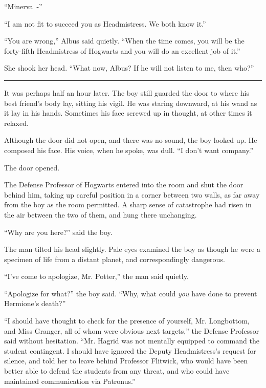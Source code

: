 ``Minerva~-''

``I am not fit to succeed you as Headmistress. We both know it.''

``You are wrong,'' Albus said quietly. ``When the time comes, you will be the forty-fifth Headmistress of Hogwarts and you will do an excellent job of it.''

She shook her head. ``What now, Albus? If he will not listen to me, then who?''

\begin{center}\rule{3in}{0.4pt}\end{center}

It was perhaps half an hour later. The boy still guarded the door to where his best friend's body lay, sitting his vigil. He was staring downward, at his wand as it lay in his hands. Sometimes his face screwed up in thought, at other times it relaxed.

Although the door did not open, and there was no sound, the boy looked up. He composed his face. His voice, when he spoke, was dull. ``I don't want company.''

The door opened.

The Defense Professor of Hogwarts entered into the room and shut the door behind him, taking up careful position in a corner between two walls, as far away from the boy as the room permitted. A sharp sense of catastrophe had risen in the air between the two of them, and hung there unchanging.

``Why are you here?'' said the boy.

The man tilted his head slightly. Pale eyes examined the boy as though he were a specimen of life from a distant planet, and correspondingly dangerous.

``I've come to apologize, Mr. Potter,'' the man said quietly.

``Apologize for what?'' the boy said. ``Why, what could \emph{you} have done to prevent Hermione's death?''

``I should have thought to check for the presence of yourself, Mr. Longbottom, and Miss Granger, all of whom were obvious next targets,'' the Defense Professor said without hesitation. ``Mr. Hagrid was not mentally equipped to command the student contingent. I should have ignored the Deputy Headmistress's request for silence, and told her to leave behind Professor Flitwick, who would have been better able to defend the students from any threat, and who could have maintained communication via Patronus.''

